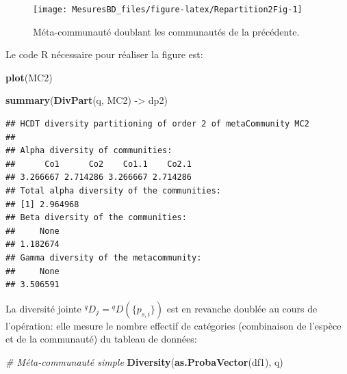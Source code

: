 \documentclass[
  11pt,
  french,
  a4paper,
  extrafontsizes,onecolumn,openright
  ]{memoir}
\newenvironment{Shaded}{\begin{snugshade}}{\end{snugshade}}
\newcommand{\CommentTok}[1]{\textcolor[rgb]{0.56,0.35,0.01}{\textit{#1}}}
\newcommand{\KeywordTok}[1]{\textcolor[rgb]{0.13,0.29,0.53}{\textbf{#1}}}
\newcommand{\NormalTok}[1]{#1}
\newcommand{\StringTok}[1]{\textcolor[rgb]{0.31,0.60,0.02}{#1}}
\begin{document}
\normalsize

\scriptsize

\begin{figure}

{\centering \texttt{[image: MesuresBD\_files/figure-latex/Repartition2Fig-1]} 

}

\caption{Méta-communauté doublant les communautés de la précédente.}\label{fig:Repartition2Fig}
\end{figure}

\normalsize

Le code R nécessaire pour réaliser la figure est:

\scriptsize

\begin{Shaded}
\begin{Highlighting}[]
\KeywordTok{plot}\NormalTok{(MC2)}
\end{Highlighting}
\end{Shaded}

\normalsize

\scriptsize

\begin{Shaded}
\begin{Highlighting}[]
\KeywordTok{summary}\NormalTok{(}\KeywordTok{DivPart}\NormalTok{(q, MC2) ->}\StringTok{ }\NormalTok{dp2)}
\end{Highlighting}
\end{Shaded}

\begin{verbatim}
## HCDT diversity partitioning of order 2 of metaCommunity MC2
## 
## Alpha diversity of communities: 
##      Co1      Co2    Co1.1    Co2.1 
## 3.266667 2.714286 3.266667 2.714286 
## Total alpha diversity of the communities: 
## [1] 2.964968
## Beta diversity of the communities: 
##     None 
## 1.182674 
## Gamma diversity of the metacommunity: 
##     None 
## 3.506591
\end{verbatim}

\normalsize

La diversité jointe \(^{q}\!D_{j}={^{q}\!D}(\{p_{s,i}\})\) est en revanche doublée au cours de l'opération: elle mesure le nombre effectif de catégories (combinaison de l'espèce et de la communauté) du tableau de données:

\scriptsize

\begin{Shaded}
\begin{Highlighting}[]
\CommentTok{# Méta-communauté simple}
\KeywordTok{Diversity}\NormalTok{(}\KeywordTok{as.ProbaVector}\NormalTok{(df1), q)}
\end{Highlighting}
\end{Shaded}
\end{document}
